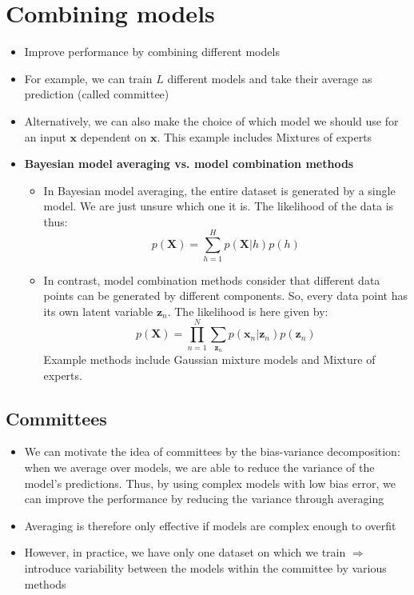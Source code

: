 \section{Combining models}
\begin{itemize}
	\item Improve performance by combining different models
	\item For example, we can train $L$ different models and take their average as prediction (called committee)
	\item Alternatively, we can also make the choice of which model we should use for an input $\bm{x}$ dependent on $\bm{x}$. This example includes Mixtures of experts
	\item \textbf{Bayesian model averaging vs. model combination methods}
	\begin{itemize}
		\item In Bayesian model averaging, the entire dataset is generated by a single model. We are just unsure which one it is. The likelihood of the data is thus:
		$$p(\bm{X}) = \sum_{h=1}^{H} p(\bm{X}|h)p(h)$$
		\item In contrast, model combination methods consider that different data points can be generated by different components. So, every data point has its own latent variable $\bm{z}_n$. The likelihood is here given by:
		$$p(\bm{X}) = \prod_{n=1}^{N}\sum_{\bm{z}_n} p(\bm{x}_n|\bm{z}_n)p(\bm{z}_n)$$
		Example methods include Gaussian mixture models and Mixture of experts.
	\end{itemize}
\end{itemize}
\subsection{Committees}
\begin{itemize}
	\item We can motivate the idea of committees by the bias-variance decomposition: when we average over models, we are able to reduce the variance of the model's predictions. Thus, by using complex models with low bias error, we can improve the performance by reducing the variance through averaging
	\item Averaging is therefore only effective if models are complex enough to overfit
	\item However, in practice, we have only one dataset on which we train $\Rightarrow$ introduce variability between the models within the committee by various methods
\end{itemize}
